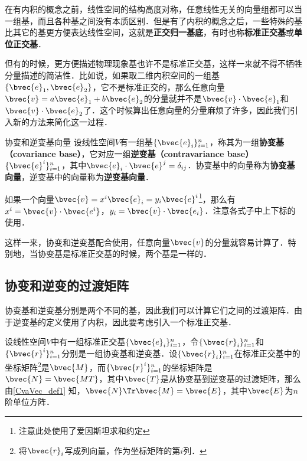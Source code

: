 

在有内积的概念之前，线性空间的结构高度对称，任意线性无关的向量组都可以当一组基，而且各种基之间没有本质区别．但是有了内积的概念之后，一些特殊的基比其它的基更方便表达线性空间，这就是\textbf{正交归一基底}，有时也称\textbf{标准正交基}或\textbf{单位正交基}．

但有的时候，更方便描述物理现象基也许不是标准正交基，这样一来就不得不牺牲分量描述的简洁性．比如说，如果取二维内积空间的一组基$\{\bvec{e}_1, \bvec{e}_2\}$，它不是标准正交的，那么任意向量$\bvec{v}=a\bvec{e}_1+b\bvec{e}_2$的分量就并不是$\bvec{v}\cdot\bvec{e}_1$和$\bvec{v}\cdot\bvec{e}_2$了．这个时候算出任意向量的分量麻烦了许多，因此我们引入新的方法来简化这一过程．

\begin{definition}{协变和逆变基向量}\label{CvaVec_def1}
设线性空间$V$有一组基$\{\bvec{e}_i\}_{i=1}^n$，称其为一组\textbf{协变基（covariance base）}，它对应一组\textbf{逆变基（contravariance base）}$\{\bvec{e}^i\}_{i=1}^n$，其中$\bvec{e}_i\cdot\bvec{e}^j=\delta_{ij}$．协变基中的向量称为\textbf{协变基向量}，逆变基中的向量称为\textbf{逆变基向量}．
\end{definition}

如果一个向量$\bvec{v}=x^i\bvec{e}_i=y_i\bvec{e}^i$\footnote{注意此处使用了爱因斯坦求和约定}，那么有$x^i=\bvec{v}\cdot\bvec{e^i}$，$y_i=\bvec{v}\cdot\bvec{e_i}$．注意各式子中上下标的使用．

这样一来，协变和逆变基配合使用，任意向量$\bvec{v}$的分量就容易计算了．特别地，当协变基是标准正交基的时候，两个基是一样的．

\subsection{协变和逆变的过渡矩阵}


协变基和逆变基分别是两个不同的基，因此我们可以计算它们之间的过渡矩阵．由于逆变基的定义使用了内积，因此要考虑引入一个标准正交基．

设线性空间$V$中有一组标准正交基$\{\bvec{e}_i\}^n_{i=1}$，令$\{\bvec{r}_i\}^n_{i=1}$和$\{\bvec{r}^i\}^n_{i=1}$分别是一组协变基和逆变基．设$\{\bvec{r}_i\}^n_{i=1}$在标准正交基中的坐标矩阵\footnote{将$\bvec{r}_i$写成列向量，作为坐标矩阵的第$i$列．}是$\bvec{M}$，而$\{\bvec{r}^i\}^n_{i=1}$的坐标矩阵是$\bvec{N}=\bvec{MT}$，其中$\bvec{T}$是从协变基到逆变基的过渡矩阵，那么由\autoref{CvaVec_def1} 知，$\bvec{N}\Tr\bvec{M}=\bvec{E}$，其中$\bvec{E}$为$n$阶单位方阵．




